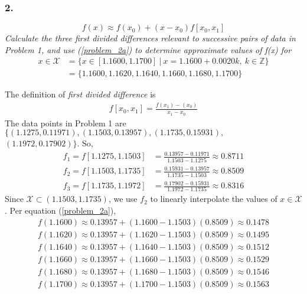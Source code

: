 \documentclass[12pt]{article}
\begin{document}
\subsubsection*{2.}

\begin{equation}
\label{problem_2a}
f(x) \approx f(x_0) + (x - x_0)f[x_0, x_1]
\end{equation}
{\it Calculate the three first divided differences relevant to successive pairs of data in Problem 1, and use (\ref{problem_2a}) to determine approximate values of f(x) for}
\begin{align*}
x \in \mathcal{X} &= \{x \in [1.1600, 1.1700] \ \big|\  x = 1.1600 + 0.0020k,\ k \in \mathbb{Z}\} \\
&= \{1.1600, 1.1620, 1.1640, 1.1660, 1.1680, 1.1700\}
\end{align*}

\noindent The definition of {\it first divided difference} is
\begin{align*}
f[x_0, x_1] = \frac{f(x_1) - (x_0)}{x_1 - x_0}
\end{align*}
The data points in Problem 1 are $\{(1.1275, 0.11971), (1.1503, 0.13957), (1.1735, 0.15931),$\\ $(1.1972, 0.17902)\}$.  So,
\begin{align*}
f_1 = f[1.1275, 1.1503] &= \frac{0.13957 - 0.11971}{1.1503 - 1.1275} \approx 0.8711\\[.2cm]
f_2 = f[1.1503, 1.1735] &= \frac{0.15931 - 0.13957}{1.1735 - 1.1503} \approx 0.8509\\[.2cm]
f_3 = f[1.1735, 1.1972] &= \frac{0.17902 - 0.15931}{1.1972 - 1.1735} \approx 0.8316
\end{align*}
Since $\mathcal{X} \subset (1.1503, 1.1735)$, we use $f_2$ to linearly interpolate the values of $x \in \mathcal{X}$.  Per equation (\ref{problem_2a}),
\begin{align*}
f(1.1600) \approx 0.13957 + (1.1600 - 1.1503)(0.8509) \approx 0.1478 \\
f(1.1620) \approx 0.13957 + (1.1620 - 1.1503)(0.8509) \approx 0.1495 \\
f(1.1640) \approx 0.13957 + (1.1640 - 1.1503)(0.8509) \approx 0.1512 \\
f(1.1660) \approx 0.13957 + (1.1660 - 1.1503)(0.8509) \approx 0.1529 \\
f(1.1680) \approx 0.13957 + (1.1680 - 1.1503)(0.8509) \approx 0.1546 \\
f(1.1700) \approx 0.13957 + (1.1700 - 1.1503)(0.8509) \approx 0.1563
\end{align*}
\end{document}
